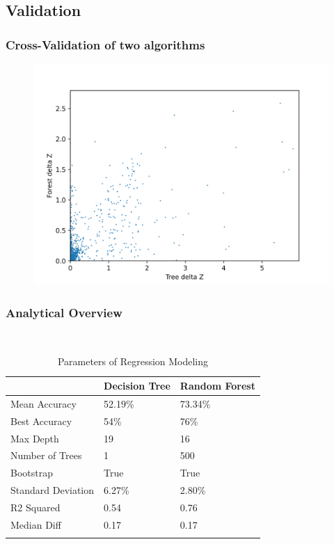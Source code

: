 \documentclass{beamer}
\begin{document}
\subsection{Validation}
\begin{frame}
	\frametitle{Cross-Validation of two algorithms}
    \begin{figure}
        \includegraphics[scale=0.60]{img/deltaZ.png}
    \end{figure}
    \end{frame}
\begin{frame}
	\frametitle{Analytical Overview}
    \begin{table}[ht]\
        \caption*{Parameters of Regression Modeling} %
        \centering %
        \begin{tabular}{l l l} %
        \hline\hline %
         &Decision Tree & Random Forest\\ [0.5ex] %
        \hline %
        Mean Accuracy& 52.19\%  & 73.34\%  \\ %
        Best Accuracy & 54\% & 76\%  \\
        Max Depth & 19 & 16  \\
        Number of Trees &  1 & 500  \\
        Bootstrap &  True & True  \\
        Standard Deviation &   6.27\% & 2.80\%  \\
        R2 Squared &  0.54 & 0.76  \\
        Median Diff &  0.17 & 0.17  \\ [1ex] %
        \hline %
        \\
        \end{tabular}
        \end{table}       
        \end{frame}
\end{document}

